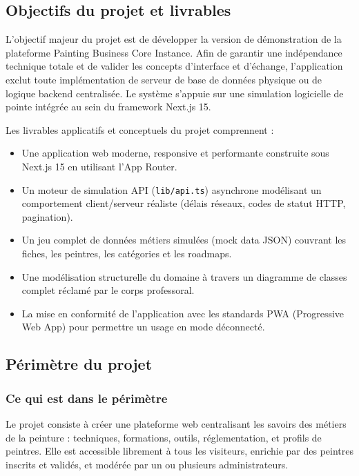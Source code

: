 \documentclass[12pt,a4paper]{report}
\begin{document}
\subsection*{Objectifs du projet et livrables}

L'objectif majeur du projet est de développer la version de démonstration de la plateforme Painting Business Core Instance. Afin de garantir une indépendance technique totale et de valider les concepts d'interface et d'échange, l'application exclut toute implémentation de serveur de base de données physique ou de logique backend centralisée. Le système s'appuie sur une simulation logicielle de pointe intégrée au sein du framework Next.js 15.

Les livrables applicatifs et conceptuels du projet comprennent :
\begin{itemize}
    \item Une application web moderne, responsive et performante construite sous Next.js 15 en utilisant l'App Router.
    \item Un moteur de simulation API (\texttt{lib/api.ts}) asynchrone modélisant un comportement client/serveur réaliste (délais réseaux, codes de statut HTTP, pagination).
    \item Un jeu complet de données métiers simulées (mock data JSON) couvrant les fiches, les peintres, les catégories et les roadmaps.
    \item Une modélisation structurelle du domaine à travers un diagramme de classes complet réclamé par le corps professoral.
    \item La mise en conformité de l'application avec les standards PWA (Progressive Web App) pour permettre un usage en mode déconnecté.
\end{itemize}

\subsection{Périmètre du projet}

\subsubsection*{Ce qui est dans le périmètre}

Le projet consiste à créer une plateforme web centralisant les savoirs des métiers de la peinture : techniques, formations, outils, réglementation, et profils de peintres. Elle est accessible librement à tous les visiteurs, enrichie par des peintres inscrits et validés, et modérée par un ou plusieurs administrateurs.
\end{document}
